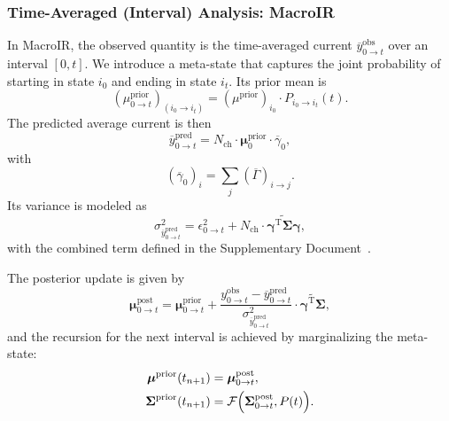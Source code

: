 \documentclass[pdflatex,sn-mathphys-num]{sn-jnl}%
\theoremstyle{thmstyleone}%
\theoremstyle{thmstyletwo}%
\theoremstyle{thmstylethree}%
\begin{document}
\subsubsection{Time-Averaged (Interval) Analysis: MacroIR}
In MacroIR, the observed quantity is the time-averaged current \(\overline{y}^{\text{obs}}_{0\rightarrow t}\) over an interval \([0,t]\). We introduce a meta-state that captures the joint probability of starting in state \(i_0\) and ending in state \(i_t\). Its prior mean is
\begin{equation}
	(\mu^{\text{prior}}_{0\rightarrow t})_{(i_0\rightarrow i_t)} = (\mu^{\text{prior}})_{i_0} \cdot P_{i_0 \rightarrow i_t}(t).
	\label{eq:meta_state_unified}
\end{equation}
The predicted average current is then
\begin{equation}
	\overline{y}^{\text{pred}}_{0\rightarrow t} = N_{\text{ch}} \cdot \boldsymbol{\mu}^{\text{prior}}_{0} \cdot \overline{\gamma}_{0},
	\label{eq:avg_current_unified}
\end{equation}
with
\begin{equation}
	(\overline{\gamma}_{0})_i = \sum_j (\overline{\Gamma})_{i \rightarrow j}.
	\label{eq:gamma_sum_unified}
\end{equation}
Its variance is modeled as
\begin{equation}
	\sigma^2_{\overline{y}^{\text{pred}}_{0\rightarrow t}} = \epsilon^2_{0\rightarrow t} + N_{\text{ch}} \cdot \widetilde{\boldsymbol{\gamma}^{\mathrm{T}}\boldsymbol{\Sigma}\boldsymbol{\gamma}},
	\label{eq:avg_variance_unified}
\end{equation}
with the combined term defined in the Supplementary Document~\cite{supplementary}.

The posterior update is given by
\begin{equation}
	\boldsymbol{\mu}^{\text{post}}_{0\rightarrow t} = \boldsymbol{\mu}^{\text{prior}}_{0\rightarrow t} + \frac{y^{\text{obs}}_{0\rightarrow t} - \overline{y}^{\text{pred}}_{0\rightarrow t}}{\sigma^2_{\overline{y}^{\text{pred}}_{0\rightarrow t}}} \cdot \widetilde{\boldsymbol{\gamma}^{\mathrm{T}}\boldsymbol{\Sigma}},
	\label{eq:post_update_unified}
\end{equation}
and the recursion for the next interval is achieved by marginalizing the meta-state:
\begin{align}
	\boldsymbol{\mu}^{\text{prior}}(t_{n+1}) &= \boldsymbol{\mu}^{\text{post}}_{0\rightarrow t}, \label{eq:recursion_mean_unified} \\
	\boldsymbol{\Sigma}^{\text{prior}}(t_{n+1}) &= \mathcal{F}\Bigl(\boldsymbol{\Sigma}^{\text{post}}_{0\rightarrow t}, P(t)\Bigr). \label{eq:recursion_cov_unified}
\end{align}
\end{document}
